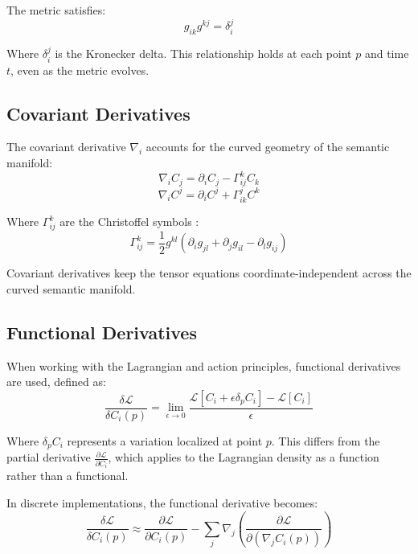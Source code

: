 The metric satisfies:
\begin{equation}
g_{ik} g^{kj} = \delta_i^j
\end{equation}

Where \(\delta_i^j\) is the Kronecker delta. This relationship holds at each point \(p\) and time \(t\), even as the metric evolves.

\subsection{Covariant Derivatives}

The covariant derivative \(\nabla_i\) accounts for the curved geometry of the semantic manifold:
\begin{equation}
\nabla_i C_j = \partial_i C_j - \Gamma^k_{ij} C_k
\end{equation}
\begin{equation}
\nabla_i C^j = \partial_i C^j + \Gamma^j_{ik} C^k
\end{equation}

Where \(\Gamma^k_{ij}\) are the Christoffel symbols \autocite{Christoffel1869}:
\begin{equation}
\Gamma^k_{ij} = \frac{1}{2} g^{kl} \left( \partial_i g_{jl} + \partial_j g_{il} - \partial_l g_{ij} \right)
\end{equation}

Covariant derivatives keep the tensor equations coordinate-independent across the curved semantic manifold.

\subsection{Functional Derivatives}

When working with the Lagrangian and action principles, functional derivatives are used, defined as:
\begin{equation}
\frac{\delta \mathcal{L}}{\delta C_i(p)} = \lim_{\epsilon \to 0} \frac{\mathcal{L}[C_i + \epsilon \delta_p C_i] - \mathcal{L}[C_i]}{\epsilon}
\end{equation}

Where \(\delta_p C_i\) represents a variation localized at point \(p\). This differs from the partial derivative \(\frac{\partial \mathcal{L}}{\partial C_i}\), which applies to the Lagrangian density as a function rather than a functional.

In discrete implementations, the functional derivative becomes:
\begin{equation}
\frac{\delta \mathcal{L}}{\delta C_i(p)} \approx \frac{\partial \mathcal{L}}{\partial C_i(p)} - \sum_j \nabla_j \left( \frac{\partial \mathcal{L}}{\partial (\nabla_j C_i(p))} \right)
\end{equation}


